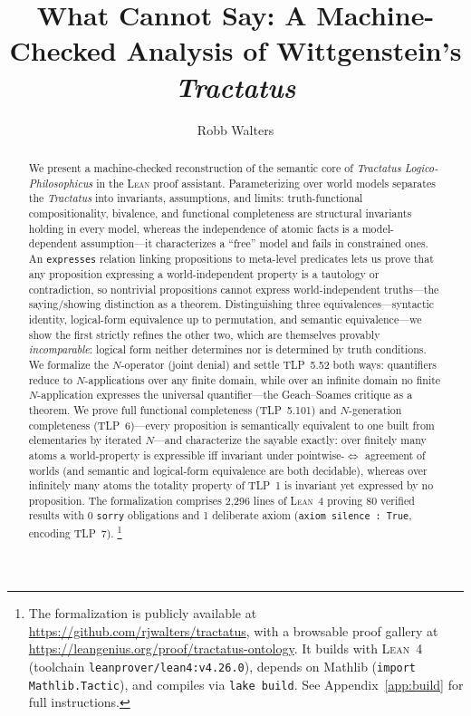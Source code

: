 \documentclass[jsl,bibother]{asl}
\title[What Lean Cannot Say]{What \Lean{} Cannot Say:
A Machine-Checked Analysis of Wittgenstein's \emph{Tractatus}}
\author{Robb Walters}
\theoremstyle{definition}
\theoremstyle{remark}
\newcommand{\Lean}{\textsc{Lean}}
\begin{document}
\begin{abstract}
We present a machine-checked reconstruction of the semantic core
of \emph{Tractatus Logico-Philosophicus} in the \Lean{} proof
assistant.  Parameterizing over world models separates the
\emph{Tractatus} into invariants, assumptions, and limits:
truth-functional compositionality, bivalence, and functional
completeness are structural invariants holding in every model,
whereas the independence of atomic facts is a model-dependent
assumption---it characterizes a ``free'' model and fails in
constrained ones.  An \texttt{expresses} relation linking
propositions to meta-level predicates lets us prove that any
proposition expressing a world-independent property is a
tautology or contradiction, so nontrivial propositions cannot
express world-independent truths---the saying/showing distinction
as a theorem.  Distinguishing three equivalences---syntactic
identity, logical-form equivalence up to permutation, and
semantic equivalence---we show the first strictly refines the
other two, which are themselves provably \emph{incomparable}:
logical form neither determines nor is determined by truth
conditions.  We formalize the $N$-operator (joint denial) and
settle TLP~5.52 both ways: quantifiers reduce to $N$-applications
over any finite domain, while over an infinite domain no finite
$N$-application expresses the universal quantifier---the
Geach--Soames critique as a theorem.  We prove full functional
completeness (TLP~5.101) and $N$-generation completeness
(TLP~6)---every proposition is semantically equivalent to one
built from elementaries by iterated $N$---and characterize the
sayable exactly: over finitely many atoms a world-property is
expressible iff invariant under pointwise-$\iff$ agreement of
worlds (and semantic and logical-form equivalence are both
decidable), whereas over infinitely many atoms the totality
property of TLP~1 is invariant yet expressed by no proposition.
The formalization comprises 2,296 lines of \Lean~4 proving 80
verified results with 0 \texttt{sorry} obligations and 1
deliberate axiom (\texttt{axiom silence : True}, encoding
TLP~7).%
\footnote{The formalization is publicly available at
  \url{https://github.com/rjwalters/tractatus},
  with a browsable proof gallery at
  \url{https://leangenius.org/proof/tractatus-ontology}.
  It builds with \Lean~4 (toolchain \texttt{leanprover/lean4:v4.26.0}),
  depends on Mathlib (\texttt{import Mathlib.Tactic}), and compiles via
  \texttt{lake build}.  See Appendix~\ref{app:build} for full
  instructions.}
\end{abstract}
\end{document}
